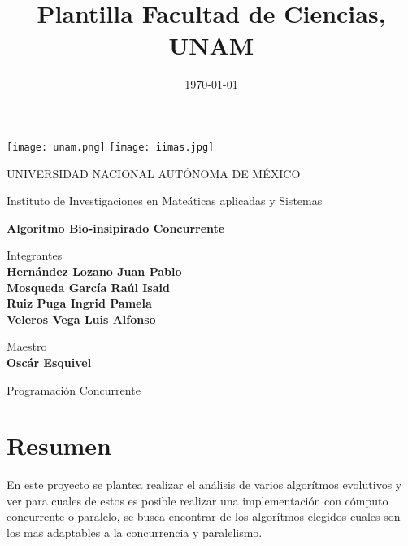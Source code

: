 \documentclass{article}
\title{Plantilla Facultad de Ciencias, UNAM}
\date{\today}
\begin{document}
\thispagestyle{empty}
	
	\texttt{[image: unam.png]}
	\texttt{[image: iimas.jpg]}
	
	\begin{center}
	\vspace{0.8cm}
	\LARGE
	UNIVERSIDAD NACIONAL AUTÓNOMA DE MÉXICO 
	
	\vspace{0.8cm}
	\LARGE
	Instituto de Investigaciones en Mate\'aticas aplicadas y Sistemas
	
	\vspace{1.7cm}	
	\Large
	\textbf{Algoritmo Bio-insipirado Concurrente}

	\vspace{1.3cm}
	\normalsize	
	Integrantes \\
	\vspace{.3cm}
	\large
	\textbf{Hernández Lozano Juan Pablo\\
	        Mosqueda Garc\'ia Ra\'ul Isaid\\
	        Ruiz Puga Ingrid Pamela\\
	        Veleros Vega Luis Alfonso}
	
	\vspace{1.3cm}
	\normalsize	
	Maestro \\
	\vspace{.3cm}
	\large
	\textbf{Osc\'ar Esquivel}
	
	\vspace{1.3cm}
	\normalsize	
	Programaci\'on Concurrente \\
	\vspace{.3cm}
	\large
	
	\vspace{1.3cm}

	\end{center}
	
	\newpage
	
\tableofcontents
\newpage

\section{Resumen}
En este proyecto se plantea realizar el análisis de varios algor\'itmos evolutivos y ver para cuales de estos es posible realizar una implementaci\'on con c\'omputo concurrente o paralelo, se busca encontrar de los algor\'itmos elegidos cuales son los mas adaptables a la concurrencia y paralelismo. 

\medskip
\end{document}
